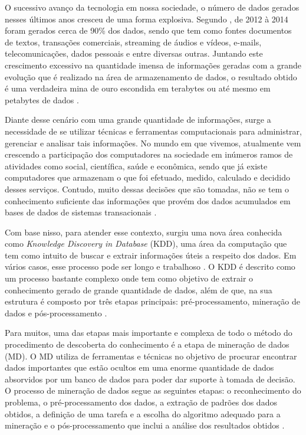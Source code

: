 
\par
O sucessivo avanço da tecnologia em nossa sociedade, o número de dados gerados nesses últimos anos cresceu de uma forma explosiva. Segundo , de 2012 à 2014 foram gerados cerca de 90\% dos dados, sendo que tem como fontes documentos de textos, transações comerciais, streaming de áudios e vídeos, e-mails, telecomunicações, dados pessoais e entre diversas outras. Juntando este crescimento excessivo na quantidade imensa de informações geradas com a grande evolução que é realizado na área de armazenamento de dados, o resultado obtido é uma verdadeira mina de ouro escondida em terabytes ou até mesmo em petabytes de dados \cite{Carvalho2014}. 

\par
Diante desse cenário com uma grande quantidade de informações, surge a necessidade de se utilizar técnicas e ferramentas computacionais para administrar, gerenciar e analisar tais informações. No mundo em que vivemos, atualmente vem crescendo a participação dos computadores na sociedade em inúmeros ramos de atividades como social, científica, saúde e econômica, sendo que já existe computadores que armazenam o que foi efetuado, medido, calculado e decidido desses serviços. Contudo, muito dessas decisões que são tomadas, não se tem o conhecimento suficiente das informações que provém dos dados acumulados em bases de dados de sistemas transacionais \cite{Rabelo2007}.

\par
Com base nisso, para atender esse contexto, surgiu uma nova área conhecida como \textit{Knowledge Discovery in Database} (KDD), uma área da computação que tem como intuito de buscar e extrair informações úteis a respeito dos dados. Em vários casos, esse processo pode ser longo e trabalhoso \cite{Stulp2014}. O KDD é descrito como um processo bastante complexo onde tem como objetivo de extrair o conhecimento gerado de grande quantidade de dados, além de que, na sua estrutura é composto por três etapas principais: pré-processamento, mineração de dados e pós-processamento \cite{Rabelo2007}.

\par
Para muitos, uma das etapas mais importante e complexa de todo o método do procedimento de descoberta do conhecimento é a etapa de mineração de dados (MD). O MD utiliza de ferramentas e técnicas no objetivo de procurar encontrar dados importantes que estão ocultos em uma enorme quantidade de dados absorvidos por um banco de dados para poder dar suporte à tomada de decisão. O processo de mineração de dados segue as seguintes etapas: o reconhecimento do problema, o pré-processamento dos dados, a extração de padrões dos dados obtidos, a definição de uma tarefa e a escolha do algoritmo adequado para a mineração e o pós-processamento que inclui a análise dos resultados obtidos \cite{Stulp2014}. 

